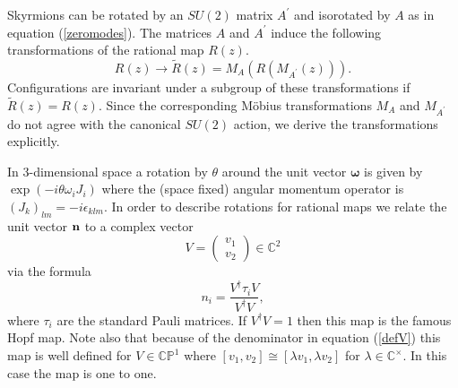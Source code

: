 \documentclass[a4paper,12pt]{article}
\def\vecomega{{\pmb{\omega}}}
\begin{document}
Skyrmions can be rotated by an $SU(2)$ matrix $A^\prime$ and isorotated 
by $A$ as in equation (\ref{zeromodes}).
The matrices $A$ and $A^\prime$ induce the following 
transformations of the rational map $R(z)$.
%
\begin{equation}
R(z) \to {\tilde R}(z) = M_A \left( R \left(M_{A^\prime}(z) \right) 
\right).
\end{equation}
%
Configurations are invariant under a subgroup of these
transformations if ${\tilde R}(z) = R(z)$. 
Since the corresponding M\"obius transformations 
$M_A$ and $M_{A^\prime}$ do not agree with the canonical $SU(2)$ action, 
we derive the transformations explicitly.

In 3-dimensional space a rotation by $\theta$ around the unit vector 
$\vecomega$ is given by $\exp(- i \theta \omega_i J_i)$ where 
the (space fixed) angular momentum  operator is 
$(J_k)_{lm} = -i \epsilon_{klm}$. 
In order to describe rotations for rational maps we relate the unit 
vector ${\bf n}$ to a complex vector
%
\begin{equation}
V = \left(
\begin{array}{c}
v_1 \\
v_2
\end{array}
\right) \in \mathbb{C}^2
\end{equation}
%
via the formula
%
\begin{equation}
\label{defV}
n_i = \frac{V^\dagger \tau_i V}{V^\dagger V},
\end{equation}
%
where $\tau_i$ are the standard Pauli matrices. If $V^\dagger V =  1$ then 
this map is the famous Hopf map. Note also that because of the denominator 
in equation (\ref{defV}) this map is well defined for $V \in \mathbb{CP}^1$ 
where $[v_1,v_2] \cong [\lambda v_1, \lambda v_2]$ for $\lambda \in 
{\mathbb C}^\times$. In this case the map is one to one.
\end{document}
